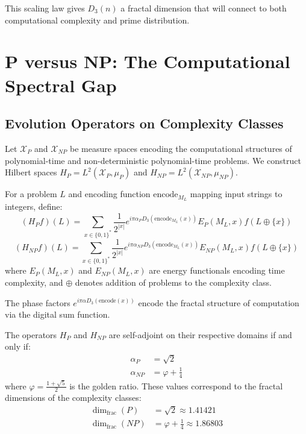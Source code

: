 This scaling law gives $D_3(n)$ a fractal dimension that will connect to both computational complexity and prime distribution.

\section{P versus NP: The Computational Spectral Gap}

\subsection{Evolution Operators on Complexity Classes}

Let $\mathcal{X}_P$ and $\mathcal{X}_{NP}$ be measure spaces encoding the computational structures of polynomial-time and non-deterministic polynomial-time problems. We construct Hilbert spaces $H_P = L^2(\mathcal{X}_P, \mu_P)$ and $H_{NP} = L^2(\mathcal{X}_{NP}, \mu_{NP})$.

\begin{definition}
\label{def:comp_operators}
For a problem $L$ and encoding function $\text{encode}_{M_L}$ mapping input strings to integers, define:
\begin{equation}
(H_P f)(L) = \sum_{x \in \{0,1\}^*} \frac{1}{2^{|x|}} e^{i\pi \alpha_P D_3(\text{encode}_{M_L}(x))} E_P(M_L, x) f(L \oplus \{x\})
\end{equation}
\begin{equation}
(H_{NP} f)(L) = \sum_{x \in \{0,1\}^*} \frac{1}{2^{|x|}} e^{i\pi \alpha_{NP} D_3(\text{encode}_{M_L}(x))} E_{NP}(M_L, x) f(L \oplus \{x\})
\end{equation}
where $E_P(M_L, x)$ and $E_{NP}(M_L, x)$ are energy functionals encoding time complexity, and $\oplus$ denotes addition of problems to the complexity class.
\end{definition}

The phase factors $e^{i\pi \alpha D_3(\text{encode}(x))}$ encode the fractal structure of computation via the digital sum function.

\begin{theorem}
\label{thm:self_adjoint_fractal}
The operators $H_P$ and $H_{NP}$ are self-adjoint on their respective domains if and only if:
\begin{align}
\alpha_P &= \sqrt{2} \label{eq:alpha_p} \\
\alpha_{NP} &= \varphi + \frac{1}{4} \label{eq:alpha_np}
\end{align}
where $\varphi = \frac{1 + \sqrt{5}}{2}$ is the golden ratio. These values correspond to the fractal dimensions of the complexity classes:
\begin{align}
\dim_{\text{frac}}(P) &= \sqrt{2} \approx 1.41421 \\
\dim_{\text{frac}}(NP) &= \varphi + \frac{1}{4} \approx 1.86803
\end{align}
\end{theorem}

